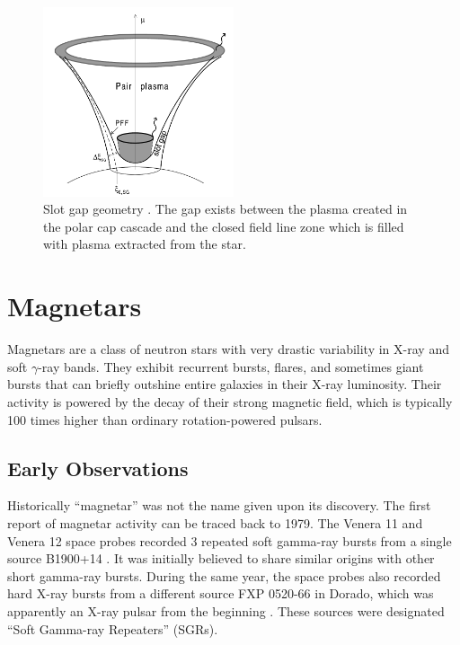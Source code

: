 \begin{figure}[h]
  \centering
  \includegraphics[width=0.5\textwidth]{pics/intro/slot-gap2.png}
  \caption[Slot gap geometry.]{Slot gap geometry \citep{muslimov_extended_2003}.
  The gap exists between the plasma created in the polar cap cascade and the
  closed field line zone which is filled with plasma extracted from the star.}
  \label{fig:slot-gap}
\end{figure}

\section{Magnetars}
\label{sec:intro-magnetars}

Magnetars are a class of neutron stars with very drastic variability in X-ray
and soft $\gamma$-ray bands. They exhibit recurrent bursts, flares, and
sometimes giant bursts that can briefly outshine entire galaxies in their X-ray
luminosity. Their activity is powered by the decay of their strong magnetic
field, which is typically 100 times higher than ordinary rotation-powered
pulsars.

\subsection{Early Observations}
\label{sec:intro-magnetar-observation}

Historically ``magnetar'' was not the name given upon its discovery. The first
report of magnetar activity can be traced back to 1979. The Venera 11 and
Venera 12 space probes recorded 3 repeated soft gamma-ray bursts from a single
source B1900+14 \citep{mazets_soft_1979}. It was initially believed to share
similar origins with other short gamma-ray bursts. During the same year, the
space probes also recorded hard X-ray bursts from a different source FXP 0520-66
in Dorado, which was apparently an X-ray pulsar from the beginning
\citep{mazets_observations_1979}. These sources were designated ``Soft Gamma-ray
Repeaters'' (SGRs).

